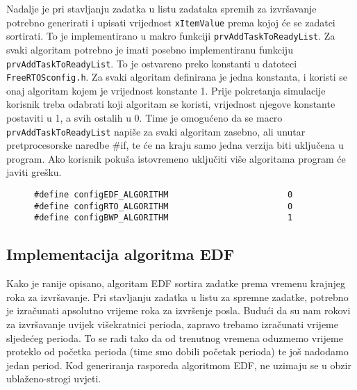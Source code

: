 \documentclass[../zavrsni.tex]{subfiles}
\begin{document}

Nadalje je pri stavljanju zadatka u listu zadataka spremih za izvršavanje potrebno generirati i upisati vrijednost \texttt{xItemValue}
prema kojoj će se zadatci sortirati. To je implementirano u makro funkciji \texttt{prvAddTaskToReadyList}. Za svaki algoritam 
potrebno je imati posebno implementiranu funkciju \texttt{prvAddTaskToReadyList}. To je ostvareno preko konstanti u datoteci 
\texttt{FreeRTOSconfig.h}. Za svaki algoritam definirana je jedna konstanta, i koristi se onaj algoritam kojem je vrijednost konstante 1.
Prije pokretanja simulacije korisnik treba odabrati koji algoritam se koristi, vrijednost njegove konstante postaviti u 1, a svih 
ostalih u 0. Time je omogućeno da se macro \texttt{prvAddTaskToReadyList} napiše za svaki algoritam zasebno, ali unutar pretprocesorske
naredbe \#if, te će na kraju samo jedna verzija biti uključena u program. Ako korisnik pokuša istovremeno uključiti više 
algoritama program će javiti grešku.

\begin{figure}[h]
\centering
\begin{lstlisting}[style=CStyle,caption={Primjer uključenja algoritma BWP},captionpos=b]
#define configEDF_ALGORITHM                        0
#define configRTO_ALGORITHM                        0
#define configBWP_ALGORITHM                        1
\end{lstlisting}
\end{figure}

\subsection{Implementacija algoritma EDF}

Kako je ranije opisano, algoritam EDF sortira zadatke prema vremenu krajnjeg roka za izvršavanje. Pri stavljanju zadatka u 
listu za spremne zadatke, potrebno je izračunati apsolutno vrijeme roka za izvršenje posla. Budući da su nam rokovi za izvršavanje
uvijek višekratnici perioda, zapravo trebamo izračunati vrijeme sljedećeg perioda. To se radi tako da od trenutnog vremena 
oduzmemo vrijeme proteklo od početka perioda (time smo dobili početak perioda) te još nadodamo jedan period. 
Kod generiranja rasporeda algoritmom EDF, ne uzimaju se u obzir ublaženo-strogi uvjeti.
\end{document}
